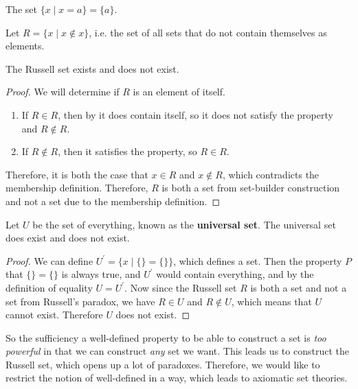 \documentclass{article}
\begin{document}
    \begin{example}
      The set $\{x \mid x = a \} = \{a\}$. 
    \end{example}

    \begin{example}
      Let $R = \{x \mid x \not\in x\}$, i.e. the set of all sets that do not contain themselves as elements. 
    \end{example}

    \begin{theorem} 
      The Russell set exists and does not exist. 
    \end{theorem}
    \begin{proof}
      We will determine if $R$ is an element of itself. 
      \begin{enumerate}
        \item If $R \in R$, then by it does contain itself, so it does not satisfy the property and $R \not\in R$. 
        \item If $R \not\in R$, then it satisfies the property, so $R \in R$. 
      \end{enumerate}
      Therefore, it is both the case that $x \in R$ and $x \not\in R$, which contradicts the membership definition. Therefore, $R$ is both a set from set-builder construction and not a set due to the membership definition. 
    \end{proof}

    \begin{theorem}
      Let $U$ be the set of everything, known as the \textbf{universal set}. The universal set does exist and does not exist. 
    \end{theorem}
    \begin{proof}
      We can define $U^\prime = \{x \mid \{\} = \{\} \}$, which defines a set. Then the property $P$ that $\{\} = \{\}$ is always true, and $U^\prime$ would contain everything, and by the definition of equality $U = U^\prime$. Now since the Russell set $R$ is both a set and not a set from Russell's paradox, we have $R \in U$ and $R \not\in U$, which means that $U$ cannot exist. Therefore $U$ does not exist. 
    \end{proof}

    So the sufficiency a well-defined property to be able to construct a set is \textit{too powerful} in that we can construct \textit{any} set we want. This leads us to construct the Russell set, which opens up a lot of paradoxes. Therefore, we would like to restrict the notion of well-defined in a way, which leads to axiomatic set theories. 
\end{document}

